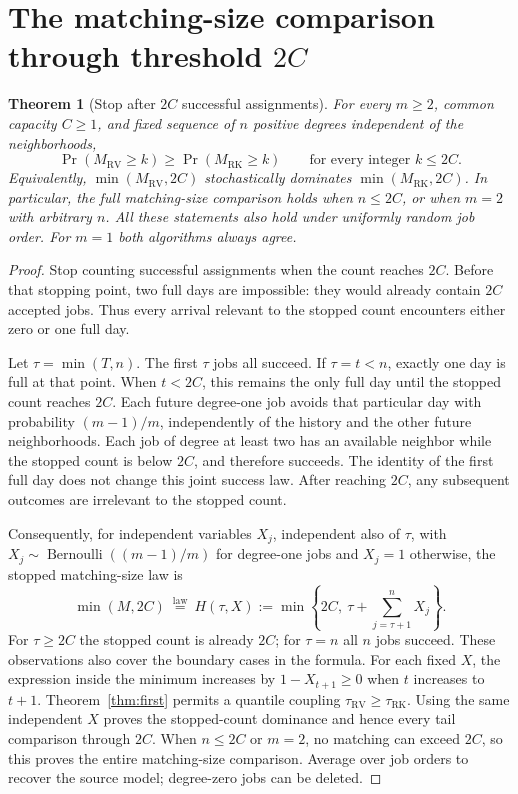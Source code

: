 \documentclass[11pt]{article}
\newtheorem{theorem}{Theorem}
\newcommand{\RV}{\mathrm{RV}}
\newcommand{\RK}{\mathrm{RK}}
\begin{document}
\section{The matching-size comparison through threshold $2C$}
\begin{theorem}[Stop after $2C$ successful assignments]\label{thm:2C}
For every $m\geq2$, common capacity $C\geq1$, and fixed sequence of
$n$ positive degrees independent of the neighborhoods,
\[
 \Pr(M_\RV\geq k)\geq\Pr(M_\RK\geq k)
 \qquad\text{for every integer }k\leq2C.
\]
Equivalently, $\min(M_\RV,2C)$ stochastically dominates
$\min(M_\RK,2C)$. In particular, the full matching-size comparison holds
when $n\leq2C$, or when $m=2$ with arbitrary $n$.
All these statements also hold under uniformly random job order.
For $m=1$ both algorithms always agree.
\end{theorem}
\begin{proof}
Stop counting successful assignments when the count reaches $2C$.
Before that stopping point, two full days are impossible: they would
already contain $2C$ accepted jobs. Thus every arrival relevant to the
stopped count encounters either zero or one full day.

Let $\tau=\min(T,n)$. The first $\tau$ jobs all succeed. If $\tau=t<n$,
exactly one day is full at that point. When $t<2C$, this remains the
only full day until the stopped count reaches $2C$. Each future degree-one
job avoids that particular day with probability $(m-1)/m$, independently
of the history and the other future neighborhoods. Each job of degree
at least two has an available neighbor while the stopped count is below
$2C$, and therefore succeeds. The identity of the first full day does
not change this joint success law. After reaching $2C$, any subsequent
outcomes are irrelevant to the stopped count.

Consequently, for independent variables $X_j$, independent also of $\tau$,
with $X_j\sim\operatorname{Bernoulli}((m-1)/m)$ for degree-one jobs and
$X_j=1$ otherwise, the stopped matching-size law is
\begin{equation}\label{eq:2C-mixture}
 \min(M,2C)\ \overset{\mathrm{law}}=\ H(\tau,X)
 :=\min\left\{2C,\ \tau+\sum_{j=\tau+1}^nX_j\right\}.
\end{equation}
For $\tau\geq2C$ the stopped count is already $2C$; for $\tau=n$
all $n$ jobs succeed. These observations also cover the boundary cases
in the formula. For each fixed $X$, the expression inside the minimum
increases by $1-X_{t+1}\geq0$ when $t$ increases to $t+1$.
Theorem~\ref{thm:first} permits
a quantile coupling $\tau_\RV\geq\tau_\RK$. Using the same independent
$X$ proves the stopped-count dominance and hence every tail comparison
through $2C$. When $n\leq2C$ or $m=2$, no matching can exceed $2C$,
so this proves the entire matching-size comparison. Average over job
orders to recover the source model; degree-zero jobs can be deleted.
\end{proof}
\end{document}
